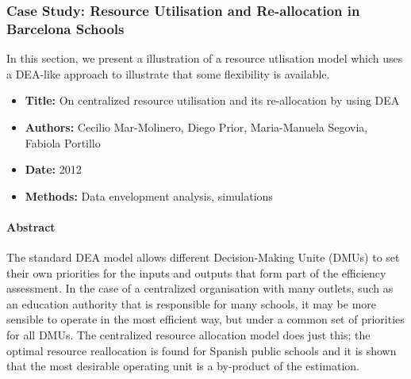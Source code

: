 \subsubsection{Case Study: Resource Utilisation and Re-allocation in Barcelona Schools}
In this section, we present a illustration of a resource utlisation model which uses a DEA-like approach to illustrate that some flexibility is available.  
\begin{itemize}[noitemsep]
\item \textbf{Title:} On centralized resource utilisation and its re-allocation by using DEA
\item \textbf{Authors:} Cecilio Mar-Molinero,  Diego Prior, Maria-Manuela Segovia, Fabiola Portillo 
\item \textbf{Date:} 2012
\item \textbf{Methods:} Data envelopment analysis, simulations
\end{itemize}
\paragraph*{Abstract} The standard DEA model allows different Decision-Making Unite (DMUs) to set their own priorities for the inputs and outputs that form part of the efficiency assessment. In the case of a centralized organisation with many outlets, such as an education authority that is responsible for many schools, it may be more sensible to operate in the most efficient way, but under a common set of priorities for all DMUs. The centralized resource allocation model does just this; the optimal resource reallocation is found for Spanish public schools and it is shown that the most desirable operating unit is a by-product of the estimation. 
